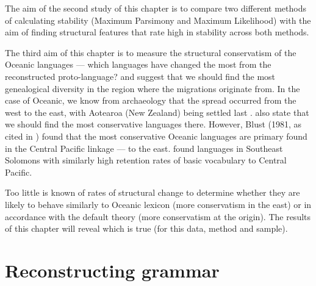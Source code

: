 \documentclass[draft,10pt]{article} %
\begin{document}
The aim of the second study of this chapter is to compare two different methods of calculating stability (Maximum Parsimony and Maximum Likelihood) with the aim of finding structural features that rate high in stability across both methods.



The third aim of this chapter is to measure the structural conservatism of the Oceanic languages --- which languages have changed the most from the reconstructed proto-language? \citet[455]{sapir1916time} and \citet[119]{lynchrosscrowleyinternalsubgroupingoceanic} suggest that we should find the most genealogical diversity in the region where the migrations originate from. In the case of Oceanic, we know from archaeology that the spread occurred from the west to the east, with Aotearoa (New Zealand) being settled last \citep{rieth_cochrane_2018}. \citet[119]{lynchrosscrowleyinternalsubgroupingoceanic} also state that we should find the most conservative languages there. However, Blust (1981, as cited in \citet[323]{blust2000lexicostatistics}) found that the most conservative Oceanic languages are primary found in the Central Pacific linkage --- to the east. \citet[523]{pawley_2009_solomons} found languages in Southeast Solomons with similarly high retention rates of basic vocabulary to Central Pacific.

Too little is known of rates of structural change to determine whether they are likely to behave similarly to Oceanic lexicon (more conservatism in the east) or in accordance with the default theory (more conservatism at the origin). The results of this chapter will reveal which is true (for this data, method and sample). 




\section{Reconstructing grammar}
\label{recon_grammar}
\end{document}
